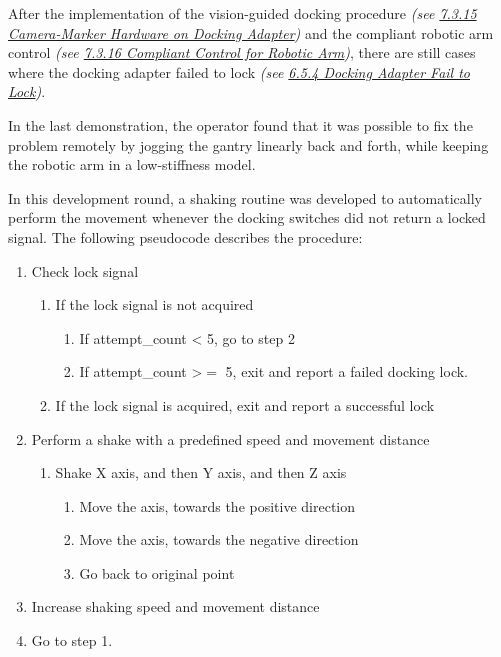 After the implementation of the vision-guided docking procedure \textit{(see \uline{7.3.15 Camera-Marker Hardware on Docking Adapter})} and the compliant robotic arm control \textit{(see \uline{7.3.16 Compliant Control for Robotic Arm})}, there are still cases where the docking adapter failed to lock \textit{(see \uline{6.5.4 Docking Adapter Fail to Lock})}.

In the last demonstration, the operator found that it was possible to fix the problem remotely by jogging the gantry linearly back and forth, while keeping the robotic arm in a low-stiffness model. 

In this development round, a shaking routine was developed to automatically perform the movement whenever the docking switches did not return a locked signal. The following pseudocode describes the procedure:

\begin{enumerate}
	\item Check lock signal

\begin{enumerate}
	\item If the lock signal is not acquired

\begin{enumerate}
	\item If attempt\_count < 5, go to step 2

	\item If attempt\_count >$=$ 5, exit and report a failed docking lock.

\end{enumerate}
	\item If the lock signal is acquired, exit and report a successful lock

\end{enumerate}
	\item Perform a shake with a predefined speed and movement distance

\begin{enumerate}
	\item Shake X axis, and then Y axis, and then Z axis

\begin{enumerate}
	\item Move the axis, towards the positive direction

	\item Move the axis, towards the negative direction

	\item Go back to original point

\end{enumerate}
\end{enumerate}
	\item Increase shaking speed and movement distance

	\item Go to step 1.

\end{enumerate}
